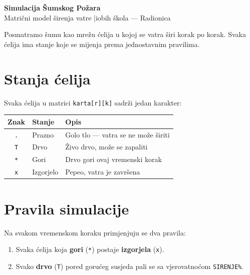 \documentclass[11pt]{article}
\begin{document}
\begin{tcolorbox}[
    enhanced,
    colback=primary!10,
    colframe=primary,
    arc=6pt,
    boxrule=1pt,
    halign=center,
]
    {\Large\bfseries\color{primary} Simulacija Šumskog Požara}\\[4pt]
    {\normalsize Matrični model širenja vatre \quad|\quad iobih škola — Radionica}
\end{tcolorbox}

\bigskip
Posmatramo šumu kao mrežu ćelija u kojoj se vatra širi korak po korak.
Svaka ćelija ima stanje koje se mijenja prema jednostavnim pravilima.

\section*{Stanja ćelija}

Svaka ćelija u matrici \texttt{karta[r][k]} sadrži jedan karakter:

\begin{center}
\begin{tabular}{@{} c l l @{}}
    \toprule
    \textbf{Znak} & \textbf{Stanje} & \textbf{Opis} \\
    \midrule
    \texttt{.} & Prazno     & Golo tlo — vatra se ne može širiti \\
    \texttt{T} & Drvo       & Živo drvo, može se zapaliti \\
    \texttt{*} & Gori       & Drvo gori ovaj vremenski korak \\
    \texttt{x} & Izgorjelo  & Pepeo, vatra je završena \\
    \bottomrule
\end{tabular}
\end{center}

\section*{Pravila simulacije}

Na svakom vremenskom koraku primjenjuju se dva pravila:

\begin{enumerate}
    \item Svaka ćelija koja \textbf{gori} (\texttt{*}) postaje \textbf{izgorjela} (\texttt{x}).
    \item Svako \textbf{drvo} (\texttt{T}) pored gorućeg susjeda pali se
          sa vjerovatnoćom \texttt{SIRENJE\%}.
\end{enumerate}
\end{document}
